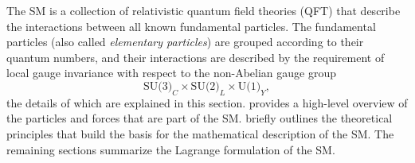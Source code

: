 

The SM is a collection of relativistic quantum field theories (QFT) that describe the interactions between all known fundamental particles. 
The fundamental particles (also called \emph{elementary particles}) are grouped according to their quantum numbers, and their interactions are described by the requirement of local gauge invariance with respect to the non-Abelian gauge group
\begin{equation}
  \label{eq:sm-gauge-group}
  \text{SU(3)}_C \times \text{SU(2)}_L \times \text{U(1)}_Y,
\end{equation}
the details of which are explained in this section.
 provides a high-level overview of the particles and forces that are part of the SM.  briefly outlines the theoretical principles that build the basis for the mathematical description of the SM. The remaining sections summarize the Lagrange formulation of the SM.
